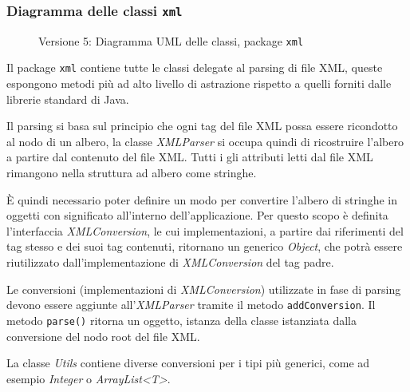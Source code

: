 \subsubsection{Diagramma delle classi \texttt{xml}}
\vspace{0.5cm}
\begin{figure}[H]
    \centering
    \caption{Versione 5: Diagramma UML delle classi, package \texttt{xml}}
    \label{fig:class_xml_v_5}
\end{figure}

Il package \texttt{xml} contiene tutte le classi delegate al parsing di file XML, queste espongono metodi più ad alto livello di astrazione rispetto a quelli forniti dalle librerie standard di Java.

Il parsing si basa sul principio che ogni tag del file XML possa essere ricondotto al nodo di un albero,
la classe \textit{XMLParser} si occupa quindi di ricostruire l'albero a partire dal contenuto del file XML.
Tutti i gli attributi letti dal file XML rimangono nella struttura ad albero come stringhe.

È quindi necessario poter definire un modo per convertire l'albero di stringhe in oggetti con significato all'interno dell'applicazione.
Per questo scopo è definita l'interfaccia \textit{XMLConversion}, le cui implementazioni,
a partire dai riferimenti del tag stesso e dei suoi tag contenuti, ritornano un generico \textit{Object}, che potrà essere riutilizzato dall'implementazione di \textit{XMLConversion} del tag padre.

Le conversioni (implementazioni di \textit{XMLConversion}) utilizzate in fase di parsing devono essere aggiunte all'\textit{XMLParser} tramite il metodo \texttt{addConversion}.
Il metodo \texttt{parse()} ritorna un oggetto, istanza della classe istanziata dalla conversione del nodo root del file XML.

La classe \textit{Utils} contiene diverse conversioni per i tipi più generici, come ad esempio \textit{Integer} o \textit{ArrayList<T>}.